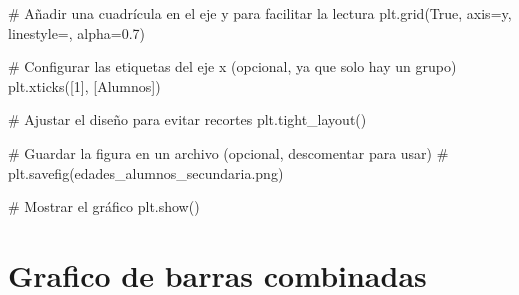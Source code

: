\documentclass[
  jou,
  floatsintext,
  longtable,
  a4paper,
  nolmodern,
  notxfonts,
  notimes,
  colorlinks=true,linkcolor=blue,citecolor=blue,urlcolor=blue]{apa7}
\newenvironment{Shaded}{\begin{snugshade}}{\end{snugshade}}
\newcommand{\CommentTok}[1]{\textcolor[rgb]{0.37,0.37,0.37}{#1}}
\newcommand{\DecValTok}[1]{\textcolor[rgb]{0.68,0.00,0.00}{#1}}
\newcommand{\FloatTok}[1]{\textcolor[rgb]{0.68,0.00,0.00}{#1}}
\newcommand{\NormalTok}[1]{\textcolor[rgb]{0.00,0.23,0.31}{#1}}
\newcommand{\OperatorTok}[1]{\textcolor[rgb]{0.37,0.37,0.37}{#1}}
\newcommand{\StringTok}[1]{\textcolor[rgb]{0.13,0.47,0.30}{#1}}
\newcommand{\VariableTok}[1]{\textcolor[rgb]{0.07,0.07,0.07}{#1}}
\begin{document}
\begin{Shaded}
\begin{Highlighting}[]
\CommentTok{\# Añadir una cuadrícula en el eje y para facilitar la lectura}
\NormalTok{plt.grid(}\VariableTok{True}\NormalTok{, axis}\OperatorTok{=}\StringTok{\textquotesingle{}y\textquotesingle{}}\NormalTok{, linestyle}\OperatorTok{=}\StringTok{\textquotesingle{}{-}{-}\textquotesingle{}}\NormalTok{, alpha}\OperatorTok{=}\FloatTok{0.7}\NormalTok{)}

\CommentTok{\# Configurar las etiquetas del eje x (opcional, ya que solo hay un grupo)}
\NormalTok{plt.xticks([}\DecValTok{1}\NormalTok{], [}\StringTok{\textquotesingle{}Alumnos\textquotesingle{}}\NormalTok{])}

\CommentTok{\# Ajustar el diseño para evitar recortes}
\NormalTok{plt.tight\_layout()}

\CommentTok{\# Guardar la figura en un archivo (opcional, descomentar para usar)}
\CommentTok{\# plt.savefig(\textquotesingle{}edades\_alumnos\_secundaria.png\textquotesingle{})}

\CommentTok{\# Mostrar el gráfico}
\NormalTok{plt.show()}
\end{Highlighting}
\end{Shaded}

\section{Grafico de barras
combinadas}\label{grafico-de-barras-combinadas}
\end{document}
